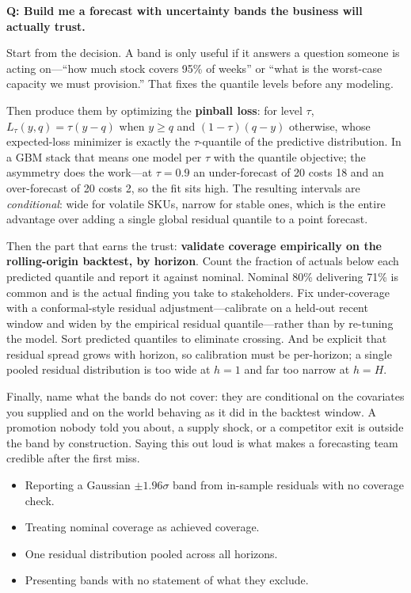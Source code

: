 \begin{interviewq}
\textbf{Q: Build me a forecast with uncertainty bands the business will actually trust.}

 \quad {} \quad \badgefreq{\freqmed}

\stronganswer

Start from the decision. A band is only useful if it answers a question someone is acting on---``how much stock covers 95\% of weeks'' or ``what is the worst-case capacity we must provision.'' That fixes the quantile levels before any modeling.

Then produce them by optimizing the \textbf{pinball loss}: for level $\tau$, $L_\tau(y,q) = \tau(y-q)$ when $y \ge q$ and $(1-\tau)(q-y)$ otherwise, whose expected-loss minimizer is exactly the $\tau$-quantile of the predictive distribution. In a GBM stack that means one model per $\tau$ with the quantile objective; the asymmetry does the work---at $\tau = 0.9$ an under-forecast of 20 costs 18 and an over-forecast of 20 costs 2, so the fit sits high. The resulting intervals are \emph{conditional}: wide for volatile SKUs, narrow for stable ones, which is the entire advantage over adding a single global residual quantile to a point forecast.

Then the part that earns the trust: \textbf{validate coverage empirically on the rolling-origin backtest, by horizon}. Count the fraction of actuals below each predicted quantile and report it against nominal. Nominal 80\% delivering 71\% is common and is the actual finding you take to stakeholders. Fix under-coverage with a conformal-style residual adjustment---calibrate on a held-out recent window and widen by the empirical residual quantile---rather than by re-tuning the model. Sort predicted quantiles to eliminate crossing. And be explicit that residual spread grows with horizon, so calibration must be per-horizon; a single pooled residual distribution is too wide at $h=1$ and far too narrow at $h=H$.

Finally, name what the bands do not cover: they are conditional on the covariates you supplied and on the world behaving as it did in the backtest window. A promotion nobody told you about, a supply shock, or a competitor exit is outside the band by construction. Saying this out loud is what makes a forecasting team credible after the first miss.

\redflags
\begin{itemize}
    \item Reporting a Gaussian $\pm 1.96\sigma$ band from in-sample residuals with no coverage check.
    \item Treating nominal coverage as achieved coverage.
    \item One residual distribution pooled across all horizons.
    \item Presenting bands with no statement of what they exclude.
\end{itemize}


\end{interviewq}
